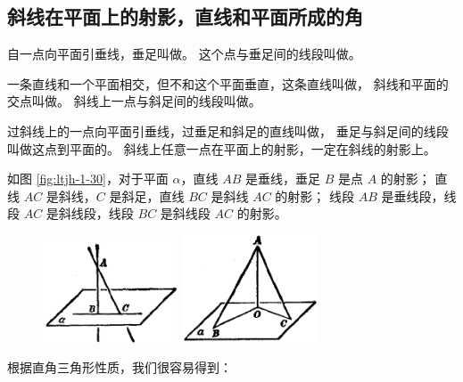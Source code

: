 \subsection{斜线在平面上的射影，直线和平面所成的角}\label{subsec:1-10}

自一点向平面引垂线，垂足叫做。
这个点与垂足间的线段叫做。

一条直线和一个平面相交，但不和这个平面垂直，这条直线叫做，
斜线和平面的交点叫做。
斜线上一点与斜足间的线段叫做。

过斜线上的一点向平面引垂线，过垂足和斜足的直线叫做，
垂足与斜足间的线段叫做这点到平面的。
斜线上任意一点在平面上的射影，一定在斜线的射影上。

如图 \ref{fig:ltjh-1-30}，对于平面 $\alpha$，直线 $AB$ 是垂线，垂足 $B$ 是点 $A$ 的射影；
直线 $AC$ 是斜线，$C$ 是斜足，直线 $BC$ 是斜线 $AC$ 的射影；
线段 $AB$ 是垂线段，线段 $AC$ 是斜线段，线段 $BC$ 是斜线段 $AC$ 的射影。

\begin{figure}[htbp]
    \centering
    \begin{minipage}[b]{7cm}
        \centering
        \includegraphics[width=4cm]{../pic/ltjh-ch1-30.png}
        \caption{}\label{fig:ltjh-1-30}
    \end{minipage}
    \qquad
    \begin{minipage}[b]{7cm}
        \centering
        \includegraphics[width=4cm]{../pic/ltjh-ch1-31.png}
        \caption{}\label{fig:ltjh-1-31}
    \end{minipage}
\end{figure}

根据直角三角形性质，我们很容易得到：

